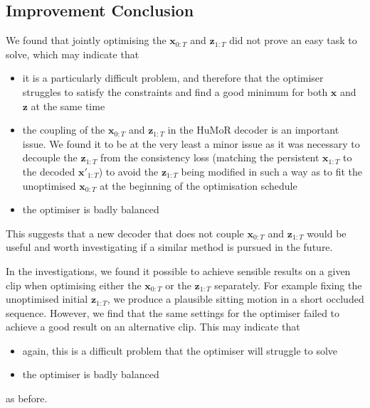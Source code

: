 \subsection{Improvement Conclusion}

We found that jointly optimising the $\mathbf{x}_{0:T}$ and $\mathbf{z}_{1:T}$ did not prove an easy task to solve, which may indicate that
\begin{itemize}
    \item it is a particularly difficult problem, and therefore that the optimiser struggles to satisfy the constraints and find a good minimum for both $\mathbf{x}$ and $\mathbf{z}$ at the same time
    \item the coupling of the $\mathbf{x}_{0:T}$ and $\mathbf{z}_{1:T}$ in the HuMoR decoder is an important issue. We found it to be at the very least a minor issue as it was necessary to decouple the $\mathbf{z}_{1:T}$ from the consistency loss (matching the persistent $\mathbf{x}_{1:T}$ to the decoded $\mathbf{x'}_{1:T}$) to avoid the $\mathbf{z}_{1:T}$ being modified in such a way as to fit the unoptimised $\mathbf{x}_{0:T}$ at the beginning of the optimisation schedule
    \item the optimiser is badly balanced
\end{itemize}
This suggests that a new decoder that does not couple $\mathbf{x}_{0:T}$ and $\mathbf{z}_{1:T}$ would be useful and worth investigating if a similar method is pursued in the future.

In the investigations, we found it possible to achieve sensible results on a given clip when optimising either the $\mathbf{x}_{0:T}$ or the $\mathbf{z}_{1:T}$ separately. For example fixing the unoptimised initial $\mathbf{z}_{1:T}$, we produce a plausible sitting motion in a short occluded sequence. However, we find that the same settings for the optimiser failed to achieve a good result on an alternative clip. This may indicate that 
\begin{itemize}
    \item again, this is a difficult problem that the optimiser will struggle to solve
    \item the optimiser is badly balanced
\end{itemize} as before.

